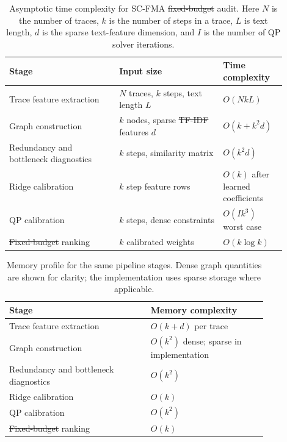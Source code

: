 \documentclass[a4paper,fleqn]{cas-sc}
\makeatletter
\newcommand{\tfidf}{\mbox{TF-IDF}} %
\newcommand{\fixedBudget}{\mbox{fixed-budget}} %
\providecommand{\DIFaddtex}[1]{{\protect\color{blue}\uwave{#1}}} %
\providecommand{\DIFdeltex}[1]{{\protect\color{red}\sout{#1}}} %
\providecommand{\DIFaddFL}[1]{\DIFadd{#1}} %
\providecommand{\DIFdelFL}[1]{\DIFdel{#1}} %
\providecommand{\DIFaddbeginFL}{} %
\providecommand{\DIFaddendFL}{} %
\providecommand{\DIFdelbeginFL}{} %
\providecommand{\DIFdelendFL}{} %
\providecommand{\DIFadd}[1]{\texorpdfstring{\DIFaddtex{#1}}{#1}} %
\providecommand{\DIFdel}[1]{\texorpdfstring{\DIFdeltex{#1}}{}} %
\providecommand{\DIFscaledelfig}{0.5}
\newlength{\DIFdelgraphicswidth} %
\newlength{\DIFdelgraphicsheight} %
\providecommand{\DIFaddincludegraphics}[2][]{{\color{blue}\fbox{\DIFOincludegraphics[#1]{#2}}}} %
\providecommand{\DIFdelincludegraphics}[2][]{%
\sbox{\DIFdelgraphicsbox}{\DIFOincludegraphics[#1]{#2}}%
\settoboxwidth{\DIFdelgraphicswidth}{\DIFdelgraphicsbox} %
\settoboxtotalheight{\DIFdelgraphicsheight}{\DIFdelgraphicsbox} %
\scalebox{\DIFscaledelfig}{%
\parbox[b]{\DIFdelgraphicswidth}{\usebox{\DIFdelgraphicsbox}\\[-\baselineskip] \rule{\DIFdelgraphicswidth}{0em}}\llap{\resizebox{\DIFdelgraphicswidth}{\DIFdelgraphicsheight}{%
\setlength{\unitlength}{\DIFdelgraphicswidth}%
\begin{picture}(1,1)%
\thicklines\linethickness{2pt} %
{\color[rgb]{1,0,0}\put(0,0){\framebox(1,1){}}}%
{\color[rgb]{1,0,0}\put(0,0){\line( 1,1){1}}}%
{\color[rgb]{1,0,0}\put(0,1){\line(1,-1){1}}}%
\end{picture}%
}\hspace*{3pt}}} %
} %
\DeclareRobustCommand{\DIFaddbeginFL}{\DIFOaddbeginFL \let\includegraphics\DIFaddincludegraphics} %
\DeclareRobustCommand{\DIFaddendFL}{\DIFOaddendFL \let\includegraphics\DIFOincludegraphics} %
\DeclareRobustCommand{\DIFdelbeginFL}{\DIFOdelbeginFL \let\includegraphics\DIFdelincludegraphics} %
\DeclareRobustCommand{\DIFdelendFL}{\DIFOaddendFL \let\includegraphics\DIFOincludegraphics} %
\let\sout@orig\sout %
\renewcommand{\sout}[1]{\ifmmode\text{\sout@orig{\ensuremath{#1}}}\else\sout@orig{#1}\fi} %
\makeatother
\begin{document}
\begin{table}[ht]
\caption{Asymptotic time complexity for SC-FMA \DIFdelbeginFL \DIFdelFL{fixed-budget }\DIFdelendFL \DIFaddbeginFL \DIFaddFL{\fixedBudget{} }\DIFaddendFL audit. Here $N$ is the number of traces, $k$ is the number of steps in a trace, $L$ is text length, $d$ is the sparse text-feature dimension, and $I$ is the number of QP solver iterations.}
\label{tab:complexity-summary}
\centering
\small
\renewcommand{\arraystretch}{1.08}
\begin{tabular}{p{0.36\linewidth}p{0.34\linewidth}p{0.20\linewidth}}
\toprule
\textbf{Stage} & \textbf{Input size} & \textbf{Time complexity} \\
\midrule
Trace feature extraction & $N$ traces, $k$ steps, text length $L$ & $O(NkL)$ \\
Graph construction & $k$ nodes, sparse \DIFdelbeginFL \DIFdelFL{TF-IDF }\DIFdelendFL \DIFaddbeginFL \DIFaddFL{\tfidf{} }\DIFaddendFL features $d$ & $O(k+k^2d)$ \\
Redundancy and bottleneck diagnostics & $k$ steps, similarity matrix & $O(k^2d)$ \\
Ridge calibration & $k$ step feature rows & $O(k)$ after learned coefficients \\
QP calibration & $k$ steps, dense constraints & $O(Ik^3)$ worst case \\
\DIFdelbeginFL \DIFdelFL{Fixed-budget }\DIFdelendFL \DIFaddbeginFL \DIFaddFL{\fixedBudget{} }\DIFaddendFL ranking & $k$ calibrated weights & $O(k\log k)$ \\
\bottomrule
\end{tabular}
\end{table}

\begin{table}[ht]
\caption{Memory profile for the same pipeline stages. Dense graph quantities are shown for clarity; the implementation uses sparse storage where applicable.}
\label{tab:memory-summary}
\centering
\small
\renewcommand{\arraystretch}{1.08}
\begin{tabular}{p{0.46\linewidth}p{0.38\linewidth}}
\toprule
\textbf{Stage} & \textbf{Memory complexity} \\
\midrule
Trace feature extraction & $O(k+d)$ per trace \\
Graph construction & $O(k^2)$ dense; sparse in implementation \\
Redundancy and bottleneck diagnostics & $O(k^2)$ \\
Ridge calibration & $O(k)$ \\
QP calibration & $O(k^2)$ \\
\DIFdelbeginFL \DIFdelFL{Fixed-budget }\DIFdelendFL \DIFaddbeginFL \DIFaddFL{\fixedBudget{} }\DIFaddendFL ranking & $O(k)$ \\
\bottomrule
\end{tabular}
\end{table}
\end{document}
